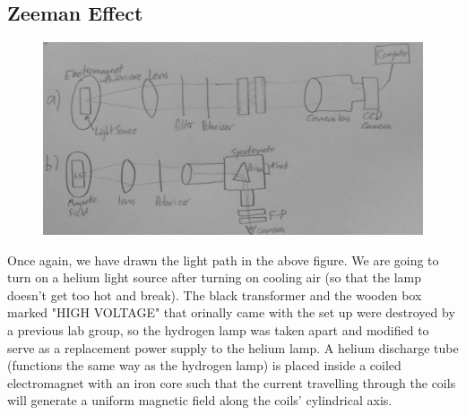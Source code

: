 \documentclass{article}
\begin{document}
    \subsection{Zeeman Effect}
    \begin{figure}[H]
    \centering
    \includegraphics[scale = 0.2]{ATM1e.jpg}
    \caption{}
    \label{fig:my_label}
\end{figure}
    Once again, we have drawn the light path in the above figure. We are going to turn on a helium light source after turning on cooling air (so that the lamp doesn't get too hot and break). The black transformer and the wooden box marked "HIGH VOLTAGE" that orinally came with the set up were destroyed by a previous lab group, so the hydrogen lamp was taken apart and modified to serve as a replacement power supply to the helium lamp. A helium discharge tube (functions the same way as the hydrogen lamp) is placed inside a coiled electromagnet with an iron core such that the current travelling through the coils will generate a uniform magnetic field along the coils' cylindrical axis. 
\end{document}
